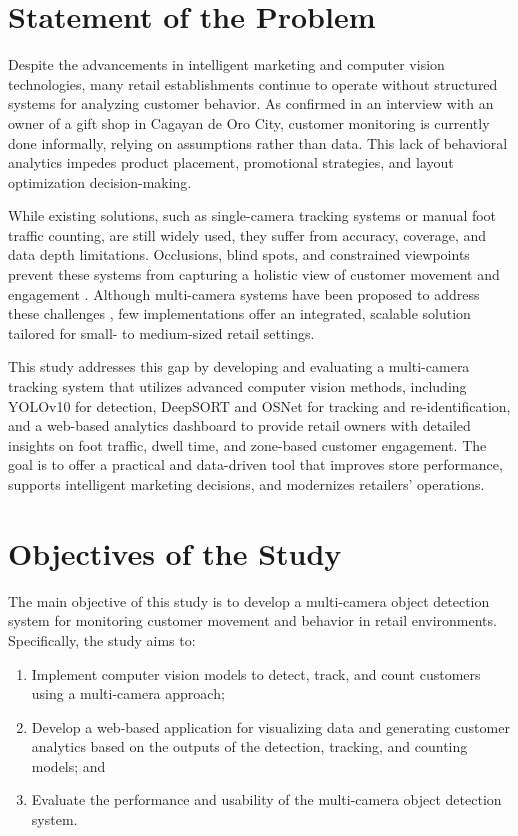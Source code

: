 {%
\section{Statement of the Problem}

Despite the advancements in intelligent marketing and computer vision technologies, many retail establishments continue to operate without structured systems for analyzing customer behavior. As confirmed in an interview with an owner of a gift shop in Cagayan de Oro City, customer monitoring is currently done informally, relying on assumptions rather than data. This lack of behavioral analytics impedes product placement, promotional strategies, and layout optimization decision-making.

While existing solutions, such as single-camera tracking systems or manual foot traffic counting, are still widely used, they suffer from accuracy, coverage, and data depth limitations. Occlusions, blind spots, and constrained viewpoints prevent these systems from capturing a holistic view of customer movement and engagement \citep{Amosa2023}. Although multi-camera systems have been proposed to address these challenges \citep{Xie2024, Chen2022}, few implementations offer an integrated, scalable solution tailored for small- to medium-sized retail settings.

This study addresses this gap by developing and evaluating a multi-camera tracking system that utilizes advanced computer vision methods, including YOLOv10 for detection, DeepSORT and OSNet for tracking and re-identification, and a web-based analytics dashboard to provide retail owners with detailed insights on foot traffic, dwell time, and zone-based customer engagement. The goal is to offer a practical and data-driven tool that improves store performance, supports intelligent marketing decisions, and modernizes retailers' operations.

\section{Objectives of the Study}
The main objective of this study is to develop a multi-camera object detection system for monitoring customer movement and behavior in retail environments. Specifically, the study aims to:

\begin{enumerate}
	\item Implement computer vision models to detect, track, and count customers using a multi-camera approach;
	\item Develop a web-based application for visualizing data and generating customer analytics based on the outputs of the detection, tracking, and counting models; and
	\item Evaluate the performance and usability of the multi-camera object detection system.
\end{enumerate}

}

